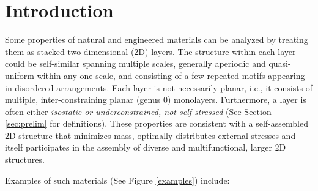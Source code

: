 \section{Introduction}
\label{sec:intro}

Some properties of natural and engineered materials can be analyzed  by
treating them as stacked two dimensional (2D) layers.
The structure within each layer could be
self-similar \cite{Intro1}
spanning multiple scales,
generally aperiodic and quasi-uniform within any one scale,
and consisting of a few repeated motifs appearing in disordered
arrangements. Each layer is not necessarily planar, i.e.,
it consists of multiple,
inter-constraining planar (genus 0) monolayers.
Furthermore, a layer is often  either
{\sl isostatic or underconstrained, not
self-stressed} (See Section \ref{sec:prelim} for definitions).
These properties are
consistent with a self-assembled 2D structure that minimizes mass,
optimally distributes external stresses and itself
participates in the assembly of diverse and multifunctional,
larger 2D structures.

Examples of such materials (See Figure \ref{examples}) include:

